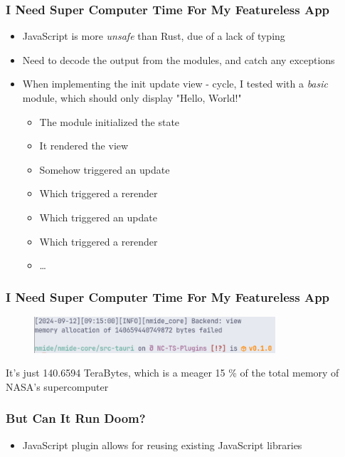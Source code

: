 \begin{frame}
  \frametitle{I Need Super Computer Time For My Featureless App}
  \begin{itemize}
    \item JavaScript is more \textit{unsafe} than Rust, due of a lack of typing
    \item Need to decode the output from the modules, and catch any exceptions
    \item When implementing the init \to update \to view - cycle, I tested with
      a \textit{basic} module, which should only display "Hello, World!"
      \begin{itemize}
        \item The module initialized the state
        \item It rendered the view
        \item Somehow triggered an update
        \item Which triggered a rerender
        \item Which triggered an update
        \item Which triggered a rerender
        \item \dots
      \end{itemize}
  \end{itemize}
\end{frame}

\begin{frame}
  \frametitle{I Need Super Computer Time For My Featureless App}
  \begin{figure}
    \centering
    \includegraphics[width=0.8\textwidth]{../../pics/memory-allocation-zoomed.png}
  \end{figure}
  It's just 140.6594 TeraBytes, which is a meager 15 \% of the total memory of NASA's
  supercomputer
\end{frame}

\begin{frame}
  \frametitle{But Can It Run Doom?}
  \begin{itemize}
    \item JavaScript plugin allows for reusing existing JavaScript libraries
  \end{itemize}
\end{frame}

